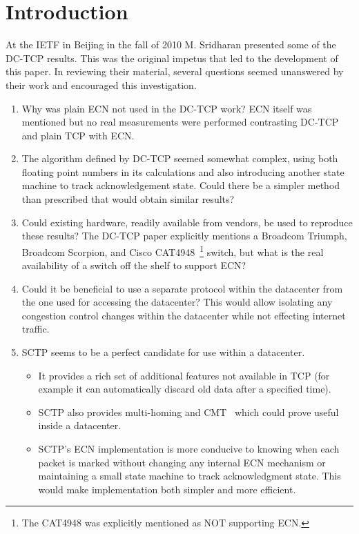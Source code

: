 \documentclass[12pt]{article}
\begin{document}
\section{Introduction}
At the IETF in Beijing in the fall of 2010 M. Sridharan presented some of the DC-TCP results.
This was the original impetus that led to the development of
this paper. In reviewing their material, several questions seemed unanswered by their
work and encouraged this investigation.

\begin{enumerate}
\item Why was plain ECN not used in the DC-TCP work? ECN itself was mentioned but no
real measurements were performed contrasting DC-TCP and plain TCP with ECN.

\item The algorithm defined by DC-TCP seemed somewhat complex,  using
both floating point numbers in its calculations and also introducing
another state machine to track acknowledgement state.  Could there be a simpler method than prescribed that would obtain similar results?

\item Could existing hardware, readily available from vendors, be used to reproduce these results? The
DC-TCP paper explicitly mentions a  Broadcom Triumph,  Broadcom Scorpion, and Cisco CAT4948~\footnote{The 
CAT4948 was explicitly mentioned as NOT supporting ECN.} switch, but what is the real availability of 
a switch off the shelf to support ECN?

\item Could it be beneficial to use a separate protocol within the
  datacenter from the one used for  accessing the datacenter?
      This would allow isolating any congestion control changes within the datacenter
      while not effecting internet traffic.

\item SCTP seems to be a perfect candidate for use within a datacenter.

\begin{itemize}
\item It provides a rich set of additional features not available in
      TCP (for example it can automatically discard old data after a specified time). 

\item SCTP also provides multi-homing and CMT~\cite{jana} which could prove useful inside a datacenter.

\item SCTP's ECN implementation is more conducive to knowing when each packet is marked without
      changing any internal ECN mechanism or maintaining a small state machine to track acknowledgment state. 
      This would make implementation both simpler and more efficient.
\end{itemize}

\end{enumerate}
\end{document}
